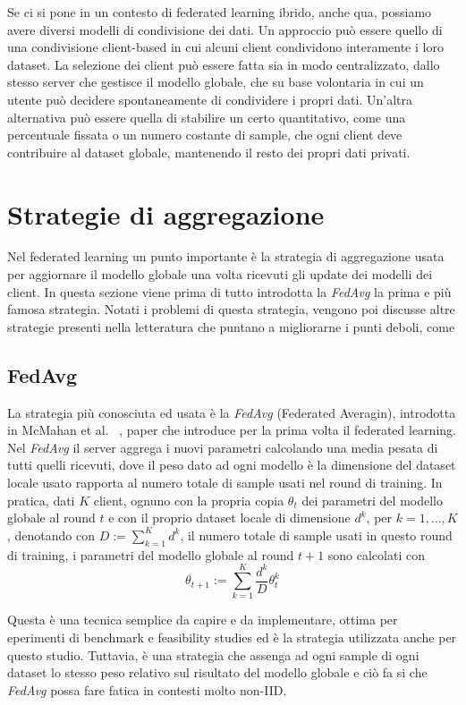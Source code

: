 Se ci si pone in un contesto di federated learning ibrido, anche qua,
possiamo avere diversi modelli di condivisione dei dati. Un approccio 
può essere quello di una condivisione client-based in cui alcuni client 
condividono interamente i loro dataset. La selezione dei client può 
essere fatta sia in modo centralizzato, dallo stesso server che gestisce 
il modello globale, che su base volontaria in cui un utente può decidere 
spontaneamente di condividere i propri dati.
Un'altra alternativa può essere quella di stabilire un certo quantitativo,
come una percentuale fissata o un numero costante di sample, che ogni 
client deve contribuire al dataset globale, mantenendo il resto dei 
propri dati privati.


\section{Strategie di aggregazione}
Nel federated learning un punto importante è la strategia di aggregazione
usata per aggiornare il modello globale una volta ricevuti gli update 
dei modelli dei client. In questa sezione viene prima di tutto introdotta 
la \textit{FedAvg} la prima e più famosa strategia. Notati i problemi 
di questa strategia, vengono poi discusse altre strategie presenti 
nella letteratura che puntano a migliorarne i punti deboli, come 

\subsection{FedAvg}
La strategia più conosciuta ed usata è la \textit{FedAvg} (Federated
Averagin), introdotta in McMahan et al. ~\cite{McMahan2016CommunicationEfficientLO},
paper che introduce per la prima volta il federated learning. Nel 
\textit{FedAvg} il server aggrega i nuovi parametri calcolando una 
media pesata di tutti quelli ricevuti, dove il peso dato ad ogni modello
è la dimensione del dataset locale usato rapporta al numero totale di 
sample usati nel round di training. In pratica, dati \(K\) client,
ognuno con la propria copia \(\theta_t\) dei parametri del modello globale 
al round \(t\) e con il proprio dataset locale di dimensione 
\(d^k\), per \(k = 1, \dots, K\), denotando con 
\(D := \sum_{k=1}^{K} d^k\), il numero totale di sample usati in
questo round di training, i parametri del modello globale al round 
\(t+1\) sono calcolati con 
\[
\theta_{t+1} := \sum_{k=1}^{K} \frac{d^k}{D} \theta_t^k
\]

Questa è una tecnica semplice da capire e da implementare, ottima per 
eperimenti di benchmark e feasibility studies ed è la strategia 
utilizzata anche per questo studio. Tuttavia, è una strategia che 
assenga ad ogni sample di ogni dataset lo stesso peso relativo sul 
risultato del modello globale e ciò fa si che \textit{FedAvg} possa 
fare fatica in contesti molto non-IID.


